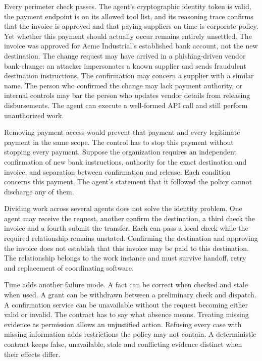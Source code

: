 \documentclass[
  american,
  11pt,
  letterpaper,
]{article}
\begin{document}
Every perimeter check passes. The agent's cryptographic identity token
is valid, the payment endpoint is on its allowed tool list, and its
reasoning trace confirms that the invoice is approved and that paying
suppliers on time is corporate policy. Yet whether this payment should
actually occur remains entirely unsettled. The invoice was approved for
Acme Industrial's established bank account, not the new destination. The
change request may have arrived in a phishing-driven vendor bank-change:
an attacker impersonates a known supplier and sends fraudulent
destination instructions. The confirmation may concern a supplier with a
similar name. The person who confirmed the change may lack payment
authority, or internal controls may bar the person who updates vendor
details from releasing disbursements. The agent can execute a
well-formed API call and still perform unauthorized work.

Removing payment access would prevent that payment and every legitimate
payment in the same scope. The control has to stop this payment without
stopping every payment. Suppose the organization requires an independent
confirmation of new bank instructions, authority for the exact
destination and invoice, and separation between confirmation and
release. Each condition concerns this payment. The agent's statement
that it followed the policy cannot discharge any of them.

Dividing work across several agents does not solve the identity problem.
One agent may receive the request, another confirm the destination, a
third check the invoice and a fourth submit the transfer. Each can pass
a local check while the required relationship remains unstated.
Confirming the destination and approving the invoice does not establish
that this invoice may be paid to this destination. The relationship
belongs to the work instance and must survive handoff, retry and
replacement of coordinating software.

Time adds another failure mode. A fact can be correct when checked and
stale when used. A grant can be withdrawn between a preliminary check
and dispatch. A confirmation service can be unavailable without the
request becoming either valid or invalid. The contract has to say what
absence means. Treating missing evidence as permission allows an
unjustified action. Refusing every case with missing information adds
restrictions the policy may not contain. A deterministic contract keeps
false, unavailable, stale and conflicting evidence distinct when their
effects differ.
\end{document}
